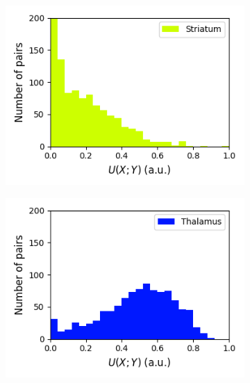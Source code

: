 \documentclass[a4paper,12pt]{article}
\theoremstyle{definition}
\begin{document}
\begin{figure}[p]
\begin{subfigure}{0.5\textwidth}
    \includegraphics[width=\textwidth]{figures/all_striatum_14_1p0_symm_unc_histogram.png}
  \end{subfigure}
  \begin{subfigure}{0.5\textwidth}
    \centering
    \includegraphics[width=\textwidth]{figures/all_thalamus_15_1p0_symm_unc_histogram.png}
  \end{subfigure}
  \begin{subfigure}{0.5\textwidth}
    \centering

\end{subfigure}
\end{figure}
\end{document}
